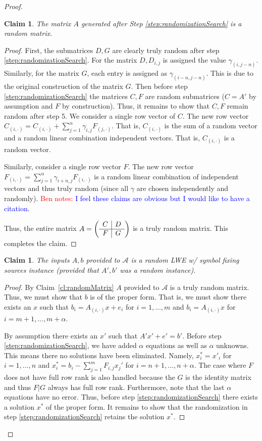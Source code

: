 \documentclass[11pt]{article}
\newcommand{\clref}[1]{\mbox{Claim~\ref{#1}}}
\newtheorem{claim}[theorem]{Claim}
\newcommand{\authnote}[2]{{\textcolor{red}{\textsf{#1 notes: }\textcolor{blue}{ #2}}\marginpar{\textcolor{red}{\textbf{!!!!!}}}}}
\newcommand{\authnote}[2]{}
\newcommand{\bnote}[1]{{\authnote{Ben}{#1}}}
\begin{document}
{\begin{proof}
\begin{claim}
The matrix $A$ generated after Step \ref{step:randomizationSearch} is a random matrix.
\end{claim}
\begin{proof}
First, the submatrices $D, G$ are clearly truly random after step \ref{step:randomizationSearch}.  For the matrix $D, D_{i, j}$ is assigned the value $\gamma_{(i,j-n)}$.  Similarly, for the matrix $G$, each entry is assigned as $\gamma_{(i-n, j-n)}$.  This is due to the original construction of the matrix $G$.  Then before step \ref{step:randomizationSearch} the matrices $C, F$ are random submatrices ($C=A'$ by assumption and $F$ by construction).  Thus, it remains to show that $C, F$ remain random after step 5.  We consider a single row vector of $C$.  The new row vector $C_{(i,\cdot)} = C_{(i,\cdot)} +\sum_{j=1}^\alpha \gamma_{i,j}F_{(j, \cdot)}$.  That is, $C_{(i,\cdot)}$ is the sum of a random vector and a random linear combination independent vectors.  That is, $C_{(i,\cdot)}$ is a random vector.  

Similarly, consider a single row vector $F$. The new row vector $F_{(i,\cdot)} = \sum_{j=1}^\alpha \gamma_{i+n,j}F_{(i,\cdot)}$ is a random linear combination of independent vectors and thus truly random (since all $\gamma$ are chosen independently and randomly).  \bnote{I feel these claims are obvious but I would like to have a citation.}

Thus, the entire matrix $A=\left(\begin{array}{c | c}C & D \\\hline F & G\end{array}\right)$ is a truly random matrix.  This completes the claim.
\end{proof}
\begin{claim}\label{cl:goodLWEinstance}
The inputs $A, b$ provided to $\mathcal{A}$ is a random LWE w/ symbol fixing sources instance (provided that $A', b'$ was a random instance).
\end{claim}
\begin{proof}
By \clref{cl:randomMatrix} $A$ provided to $\mathcal{A}$ is a truly random matrix.  Thus, we must show that $b$ is of the proper form.  That is, we must show there exists an $x$ such that $b_i = A_{(i , \cdot)} x + e_i$ for $i=1,...,m$ and $b_i = A_{(i, \cdot)} x$ for $i=m+1,...,m+\alpha$.

By assumption there exists an $x'$ such that $A'x'+e' = b'$.  Before step \ref{step:randomizationSearch}, we have added $\alpha$ equations as well as $\alpha$ unknowns.  This means there no solutions have been eliminated.  Namely, $x^*_i = x'_i$ for $i=1,...,n$ and $x^*_i = b_i - \sum_{j=1}^m F_{i, j} x_j'$ for $i=n+1,..., n+\alpha$.  The case where $F$ does not have full row rank is also handled because the $G$ is the identity matrix and thus $F|G$ always has full row rank.  Furthermore, note that the last $\alpha$ equations have no error.  Thus, before step \ref{step:randomizationSearch} there exists a solution $x^*$ of the proper form.  It remains to show that the randomization in step \ref{step:randomizationSearch} retains the solution $x^*$.


\end{proof}
\end{proof}}
\end{document}
